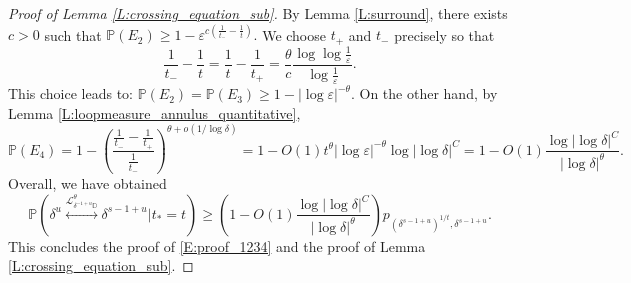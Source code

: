 \documentclass[10pt,a4paper]{amsart}
\newcommand{\D}{\mathbb{D}}
\newcommand{\Lc}{\mathcal{L}}
\newcommand{\Prob}[1]{\mathbb{P} \left( #1 \right) }
\newcommand{\eps}{\varepsilon}
\begin{document}
\begin{proof}[Proof of Lemma \ref{L:crossing_equation_sub}]
By Lemma \ref{L:surround}, there exists $c>0$ such that
$
\Prob{ E_2 } \geq 1 - \eps^{c (\frac{1}{t_-} - \frac1t)}.
$
We choose $t_+$ and $t_-$ precisely so that
\[
\frac{1}{t_-} - \frac{1}{t} = \frac1t - \frac{1}{t_+} = \frac{\theta}{c} \frac{\log \log \frac1\eps}{\log \frac1\eps}.
\]
This choice leads to:
$\Prob{ E_2 } = \Prob{E_3} \geq 1 - |\log \eps|^{-\theta}.$
On the other hand, by Lemma \ref{L:loopmeasure_annulus_quantitative},
\[
\Prob{ E_4 } = 1 - \left( \frac{\frac{1}{t_-} - \frac{1}{t_+}}{ \frac{1}{t_-} } \right)^{\theta + o(1/\log \delta)} = 1 - O(1) t^{\theta} |\log \eps|^{-\theta} \log |\log \delta|^C = 1 - O(1) \frac{\log |\log \delta|^C}{|\log \delta|^\theta}.
\]
Overall, we have obtained 
\[
\Prob{ \delta^u \overset{\Lc_{\delta^{-1+u} \D}^\theta}{\longleftrightarrow} \delta^{s-1+u} \Big\vert t_* = t}
\geq \left( 1 - O(1) \frac{\log |\log \delta|^C}{|\log \delta|^\theta} \right) p_{(\delta^{s-1+u})^{1/t},\delta^{s-1+u}}.
\]
This concludes the proof of \eqref{E:proof_1234} and the proof of Lemma \ref{L:crossing_equation_sub}.
\end{proof}
\end{document}
